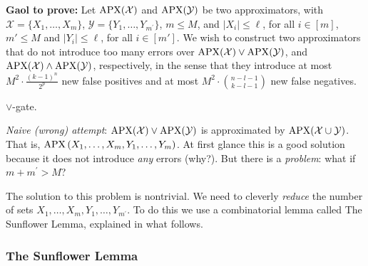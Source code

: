 \begin{tcolorbox}[colframe=white, colback=gray!11, boxrule=0mm, sharp corners]
\textbf{Gaol to prove:}
Let $\operatorname{\mathrm{APX}}(\mathcal X)$ and 
$\operatorname{\mathrm{APX}}(\mathcal Y)$ be 
two approximators,
with $\mathcal{X}=\{X_1, \ldots, X_m\}$, 
$\mathcal{Y}=\{Y_1, \ldots, Y_{m^{\prime}}\}$, $m\le M$, and $\left|X_i\right| \leq \ell $, for all $i\in[m]$, $m'\le M $ and $\left|Y_i\right| \leq \ell$, for all $i\in[m']$.
We wish to construct   two approximators that do not introduce too many errors over  $\mathrm{APX}(\mathcal{X}) \vee \mathrm{APX}(\mathcal{Y})$, and $\operatorname{\mathrm{APX}}(\mathcal X) \wedge 
\operatorname{\mathrm{APX}}(\mathcal Y)$, respectively,
in the sense that they introduce at most $M^2 \cdot \frac{(k-1)^n}{2^p}$ new false positives and at most $M^2 \cdot\binom{n-l-1}{k-l-1}$  new false negatives.\end{tcolorbox}


 







$\lor$-gate.

\textit{Naive (wrong) attempt}: $\operatorname{\mathrm{APX}}(\mathcal X)
\lor \operatorname{\mathrm{APX}}(\mathcal Y)$ is approximated by $\operatorname{\mathrm{APX}}(\mathcal X \cup \mathcal Y)$. That is, $\operatorname{\mathrm{APX}}\left(X_1, \ldots, X_m, Y_1, \ldots, Y_m\right)$. At first glance this is a good solution because it does not introduce \emph{any} errors (why?). But there is a \textit{problem}: what if $m+m^{\prime}>M$?


The solution to this problem is nontrivial. We need to cleverly \emph{reduce} the number of sets $X_1, \ldots, X_m, Y_1, \ldots, Y_{m^{\prime}}$. To do this we use a combinatorial lemma called The Sunflower Lemma, explained in what follows. 

\subsubsection{The Sunflower Lemma}

